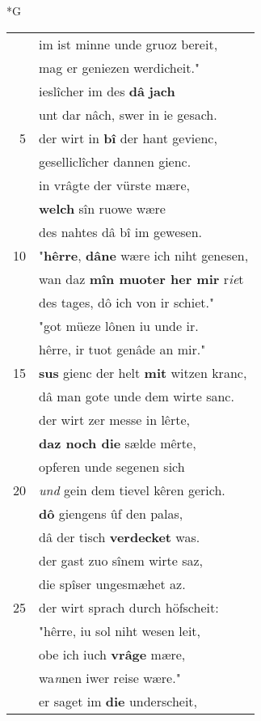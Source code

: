 \documentclass[8pt,a4paper,notitlepage]{article}
\begin{document}
\begin{table}[ht]
\begin{minipage}[t]{0.5\linewidth}
\small
\begin{center}*G
\end{center}
\begin{tabular}{rl}
 & im ist minne unde gruoz bereit,\\ 
 & mag er geniezen werdicheit."\\ 
 & ieslîcher im des \textbf{dâ} \textbf{jach}\\ 
 & unt dar nâch, swer in ie gesach.\\ 
5 & der wirt in \textbf{bî} der hant gevienc,\\ 
 & geselliclîcher dannen gienc.\\ 
 & in vrâgte der vürste mære,\\ 
 & \textbf{welch} sîn ruowe wære\\ 
 & des nahtes dâ bî im gewesen.\\ 
10 & "\textbf{hêrre}, \textbf{dâ}\textbf{ne} wære ich niht genesen,\\ 
 & wan daz \textbf{mîn muoter her mir} r\textit{ie}t\\ 
 & des tages, dô ich von ir schiet."\\ 
 & "got müeze lônen iu unde ir.\\ 
 & hêrre, ir tuot genâde an mir."\\ 
15 & \textbf{sus} gienc der helt \textbf{mit} witzen kranc,\\ 
 & dâ man gote unde dem wirte sanc.\\ 
 & der wirt zer messe in lêrte,\\ 
 & \textbf{daz noch die} sælde mêrte,\\ 
 & opferen unde segenen sich\\ 
20 & \textit{und} gein dem tievel kêren gerich.\\ 
 & \textbf{dô} giengens ûf den palas,\\ 
 & dâ der tisch \textbf{verdecket} was.\\ 
 & der gast zuo sînem wirte saz,\\ 
 & die spîser ungesmæhet az.\\ 
25 & der wirt sprach durch höfscheit:\\ 
 & "hêrre, iu sol niht wesen leit,\\ 
 & obe ich iuch \textbf{vrâge} mære,\\ 
 & wa\textit{n}nen iwer reise wære."\\ 
 & er saget im \textbf{die} underscheit,\\ 

\end{tabular}
\end{minipage}
\end{table}
\end{document}
